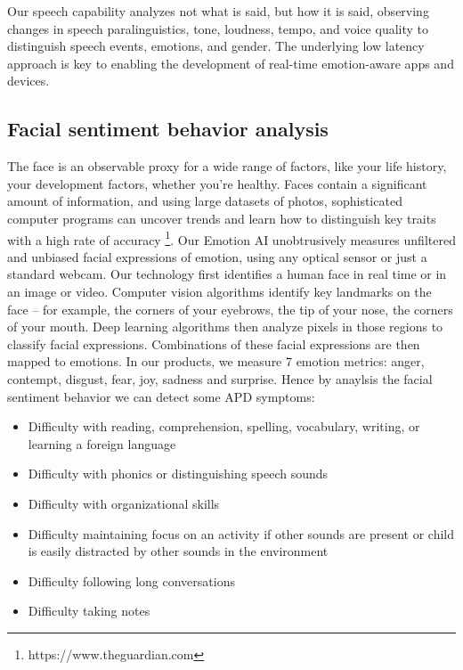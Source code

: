\documentclass[letterpaper%
, twoside%
, 12pt%
,these%
, english%
,creativecommons,hyperref%
]{thETS}
\begin{document}
Our speech capability analyzes not what is said, but how it is said, observing changes in speech
paralinguistics, tone, loudness, tempo, and voice quality to distinguish speech events, emotions,
and gender. The underlying low latency approach is key to enabling the development of
real-time emotion-aware apps and devices.





\subsection{Facial sentiment behavior analysis}
The face is an observable proxy for a wide range of factors, like your life history, your development
factors, whether you’re healthy. Faces contain a significant amount of information,
and using large datasets of photos, sophisticated computer programs can uncover trends and
learn how to distinguish key traits with a high rate of accuracy \footnote{https://www.theguardian.com}. Our Emotion AI unobtrusively
measures unfiltered and unbiased facial expressions of emotion, using any optical sensor
or just a standard webcam. Our technology first identifies a human face in real time or in an
image or video. Computer vision algorithms identify key landmarks on the face – for example,
the corners of your eyebrows, the tip of your nose, the corners of your mouth. Deep learning
algorithms then analyze pixels in those regions to classify facial expressions. Combinations of
these facial expressions are then mapped to emotions. In our products, we measure 7 emotion
metrics: anger, contempt, disgust, fear, joy, sadness and surprise. Hence by anaylsis the facial
sentiment behavior we can detect some APD symptoms:
\begin{itemize}
	\item  Difficulty with reading, comprehension, spelling, vocabulary, writing, or learning a foreign
	language
		\item  Difficulty with phonics or distinguishing speech sounds
		\item  Difficulty with organizational skills
		\item  Difficulty maintaining focus on an activity if other sounds are present or child is easily
	distracted by other sounds in the environment
		\item  Difficulty following long conversations
		\item  Difficulty taking notes
	
\end{itemize}
\end{document}

